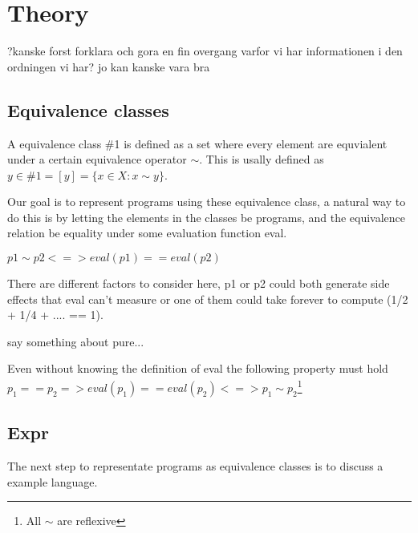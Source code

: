 

\newcommand{\defBNF}[4] {\text{#1}\quad&#2&::=&\;#3&\text{#4}}
\newcommand{\defaltBNF}[2] {&&|&\;#1&\text{#2}} 

\section{Theory}

?kanske forst forklara och gora en fin overgang varfor vi har informationen i den ordningen vi har?
jo kan kanske vara bra
\subsection{Equivalence classes}


A equivalence class \#1 is defined as a set where every element are equvialent under a certain equivalence operator $\sim$. This is usally defined as 
$y \in\#1 = [y] = \{x \in X : x \sim y\}$.

Our goal is to represent programs using these equivalence class, a natural way to do this is by letting the elements in the classes be programs, and the equivalence relation be equality under some evaluation function eval.

$p1 \sim p2 <=> eval(p1) == eval(p2)$

There are different factors to consider here, p1 or p2 could both generate side effects that eval can't measure or one of them could take forever to compute (1/2 + 1/4 + .... == 1).

say something about pure...

Even without knowing the definition of eval the following property must hold
$p_1 == p_2 => eval(p_1) == eval(p_2) <=> p_1 \sim p_2$\footnote{All $\sim$ are reflexive}



\subsection{Expr}

The next step to representate programs as equivalence classes is to discuss a example language. 

